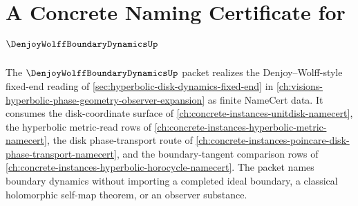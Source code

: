 \chapter{A Concrete Naming Certificate for $\DenjoyWolffBoundaryDynamicsUp$}
\label{ch:concrete-instances-denjoy-wolff-boundary-dynamics-namecert}

The $\DenjoyWolffBoundaryDynamicsUp$ packet realizes the Denjoy--Wolff-style fixed-end reading of \autoref{sec:hyperbolic-disk-dynamics-fixed-end} in \autoref{ch:visions-hyperbolic-phase-geometry-observer-expansion} as finite NameCert data. It consumes the disk-coordinate surface of \autoref{ch:concrete-instances-unitdisk-namecert}, the hyperbolic metric-read rows of \autoref{ch:concrete-instances-hyperbolic-metric-namecert}, the disk phase-transport route of \autoref{ch:concrete-instances-poincare-disk-phase-transport-namecert}, and the boundary-tangent comparison rows of \autoref{ch:concrete-instances-hyperbolic-horocycle-namecert}. The packet names boundary dynamics without importing a completed ideal boundary, a classical holomorphic self-map theorem, or an observer substance.


